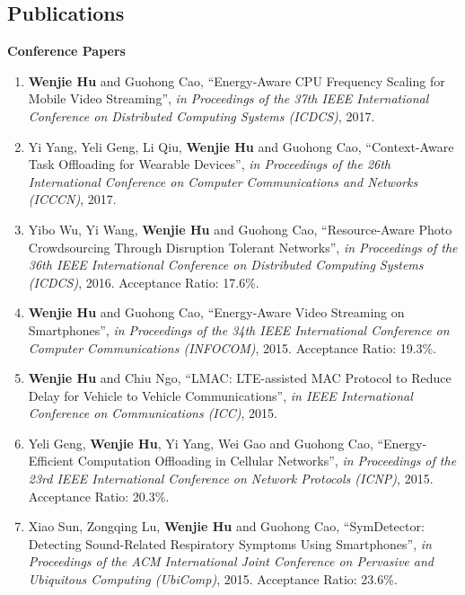 \documentclass[margin,line]{res}
\begin{document}
\begin{resume}
\section{\sc Publications}


\vspace{-0.1in}
{\bf Conference Papers}
\vspace*{.05in}
\begin{enumerate} [leftmargin=5mm]%
\item {\bf Wenjie Hu} and Guohong Cao, ``Energy-Aware CPU Frequency Scaling for Mobile Video Streaming'', {\em in Proceedings of the 37th IEEE International Conference on Distributed Computing Systems (ICDCS)}, 2017.
\item Yi Yang, Yeli Geng, Li Qiu, {\bf Wenjie Hu} and Guohong Cao, ``Context-Aware Task Offloading for Wearable Devices'', {\em in Proceedings of the 26th International Conference on Computer Communications and Networks (ICCCN)}, 2017.
\item Yibo Wu, Yi Wang, {\bf Wenjie Hu} and Guohong Cao, ``Resource-Aware Photo Crowdsourcing Through Disruption Tolerant Networks'', {\em in Proceedings of the 36th IEEE International Conference on Distributed Computing Systems (ICDCS)}, 2016. Acceptance Ratio: 17.6\%. %
\item {\bf Wenjie Hu} and Guohong Cao, ``Energy-Aware Video Streaming on Smartphones'', {\it in Proceedings of the 34th IEEE International Conference on Computer Communications (INFOCOM)}, 2015. Acceptance Ratio: 19.3\%.%
\item {\bf Wenjie Hu} and Chiu Ngo, ``LMAC: LTE-assisted MAC Protocol to Reduce Delay for Vehicle to Vehicle Communications'', {\em in IEEE International Conference on Communications (ICC)}, 2015. %
\item Yeli Geng, {\bf Wenjie Hu}, Yi Yang, Wei Gao and Guohong Cao, ``Energy-Efficient Computation Offloading in Cellular Networks'', {\it in Proceedings of the 23rd IEEE International Conference on Network Protocols (ICNP)}, 2015. Acceptance Ratio: 20.3\%.%
\item Xiao Sun, Zongqing Lu, {\bf Wenjie Hu} and Guohong Cao, ``SymDetector: Detecting Sound-Related Respiratory Symptoms Using Smartphones'', {\it in Proceedings of the ACM International Joint Conference on Pervasive and Ubiquitous Computing (UbiComp)}, 2015. Acceptance Ratio: 23.6\%.%

\end{enumerate}
\end{resume}
\end{document}
